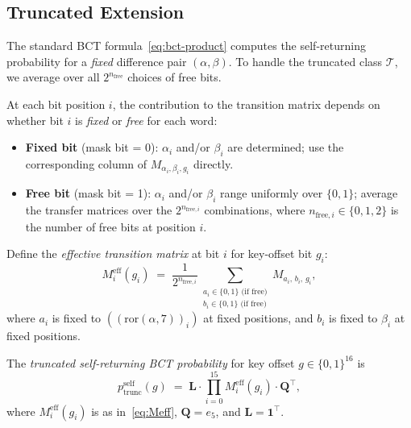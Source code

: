 \documentclass[runningheads]{llncs}
\newcommand{\pself}{p^{\mathrm{self}}_{\mathrm{trunc}}}
\begin{document}
\subsection{Truncated Extension}
\label{subsec:trunc-ext}

The standard BCT formula~\eqref{eq:bct-product} computes the
self-returning probability for a \emph{fixed} difference pair
$(\alpha, \beta)$.  To handle the truncated class $\mathcal{T}$, we
average over all $2^{n_{\mathrm{free}}}$ choices of free bits.

At each bit position $i$, the contribution to the transition matrix depends
on whether bit $i$ is \emph{fixed} or \emph{free} for each word:
\begin{itemize}
  \item \textbf{Fixed bit} (mask bit = 0): $\alpha_i$ and/or $\beta_i$ are
    determined; use the corresponding column of $M_{\alpha_i, \beta_i, g_i}$
    directly.
  \item \textbf{Free bit} (mask bit = 1): $\alpha_i$ and/or $\beta_i$ range
    uniformly over $\{0,1\}$; average the transfer matrices over the
    $2^{n_{\mathrm{free},i}}$ combinations, where $n_{\mathrm{free},i}
    \in \{0, 1, 2\}$ is the number of free bits at position $i$.
\end{itemize}
Define the \emph{effective transition matrix} at bit $i$ for key-offset
bit $g_i$:
\begin{equation}
  \label{eq:Meff}
  M^{\mathrm{eff}}_i(g_i)
  \;=\;
  \frac{1}{2^{n_{\mathrm{free},i}}}
  \sum_{\substack{a_i \in \{0,1\} \text{ (if free)} \\ b_i \in \{0,1\} \text{ (if free)}}}
  M_{a_i,\, b_i,\, g_i},
\end{equation}
where $a_i$ is fixed to $((\text{ror}(\alpha,7))_i)$ at fixed positions,
and $b_i$ is fixed to $\beta_i$ at fixed positions.

\begin{definition}
  \label{def:pself}
  The \emph{truncated self-returning BCT probability} for key offset
  $g \in \{0,1\}^{16}$ is
  \begin{equation}
    \label{eq:pself}
    \pself(g)
    \;=\;
    \mathbf{L} \cdot \prod_{i=0}^{15} M^{\mathrm{eff}}_i(g_i) \cdot
    \mathbf{Q}^{\top},
  \end{equation}
  where $M^{\mathrm{eff}}_i(g_i)$ is as in~\eqref{eq:Meff}, $\mathbf{Q} = e_5$,
  and $\mathbf{L} = \mathbf{1}^{\top}$.
\end{definition}
\end{document}
